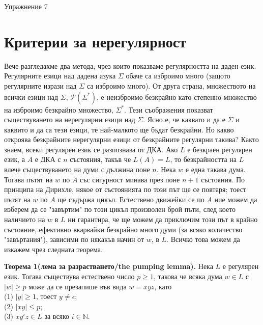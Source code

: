 \documentclass{article}
\begin{document}
\begin{center}
    {\huge Упражнение 7}
\end{center}

\vspace{15pt}

\section{Критерии за нерегулярност}
    \hspace{15pt} Вече разгледахме два метода, чрез които показваме регулярността на 
    даден език. Регулярните езици над дадена азука $\Sigma$ обаче са изброимо много (защото 
    регулярните изрази над $\Sigma$ са изброимо много). От друга страна, 
    множеството на всички езици над $\Sigma$, $\mathscr{P}(\Sigma^*)$, е неизброимо
    безкрайно като степенно множество на изброимо безкрайно множество, $\Sigma^*$.
    Тези съображения показват съществуването на нерегулярни езици над $\Sigma$.
    Ясно е, че каквато и да е $\Sigma$ и каквито и да са тези езици, те най-малкото 
    ще бъдат безкрайни. Но какво откроява безкрайните нерегулярни езици от безкрайните
    регулярни такива? Както знаем, всеки регулярен език се разпознава от ДКА. Ако $L$
    е безкраен регулярен език, а $A$ е ДКА с $n$ състояния, такъв че $L(A) = L$, 
    то безкрайността на $L$ влече съществуването на думи с дължина поне $n$. Нека
    $w$ е една такава дума. Тогава пътят на $w$ по $A$ със сигурност минава през поне
    $n+1$ състояния. По принципа на Дирихле, някое от състоянията по този път ще се 
    повтаря; тоест пътят на $w$ по $A$ ще съдържа цикъл. Естествено движейки се по $A$
    ние можем да изберем да се "завъртим"\hspace{0.01cm} по този цикъл произволен брой пъти, след което
    наличието на $w$ в $L$ ни гарантира, че ще можем да приключим този път в крайно
    състояние, ефективно вкарвайки безкрайно много думи (за всяко количество "завъртания"),
    зависими по някакъв начин от $w$, в $L$. Всичко това можем да изкажем чрез следната
    теорема.

    \vspace{15pt}

    \textbf{Теорема 1(лема за разрастването/the pumping lemma).} Нека $L$ е регулярен
    език. Тогава съществува естествено число $p \geq 1$, такова че всяка дума $w \in L$
    с $|w| \geq p$ може да се презапише във вида $w = xyz$, като \\
    (1) $|y| \geq 1$, тоест $y \neq \epsilon$; \\
    (2) $|xy| \leq p$; \\
    (3) $xy^iz \in L$ за всяко $i \in \mathbb{N}$.
\end{document}
